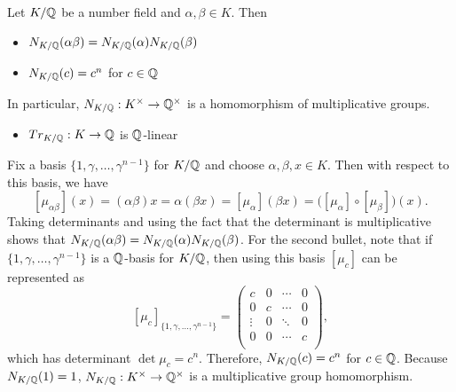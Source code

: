 \begin{prop} 
Let $K/\mathbb{Q}$ be a number field and $\alpha, \beta \in K$. Then 
	\begin{itemize}
	\item $N_{K/\mathbb{Q}}(\alpha\beta)= N_{K/\mathbb{Q}}(\alpha) N_{K/\mathbb{Q}}(\beta)$
	\item $N_{K/\mathbb{Q}}(c)= c^n$ for $c \in \mathbb{Q}$
	\end{itemize}
In particular, $N_{K/\mathbb{Q}}: K^\times \to \mathbb{Q}^\times$ is a homomorphism of multiplicative groups.
	\begin{itemize}
	\item $Tr_{K/\mathbb{Q}}: K \to \mathbb{Q}$ is $\mathbb{Q}$-linear
	\end{itemize}
\end{prop}

\pf Fix a basis $\{ 1, \gamma, \ldots, \gamma^{n-1} \}$ for $K/\mathbb{Q}$ and choose $\alpha, \beta, x \in K$. Then with respect to this basis, we have
	\[
	[\mu_{\alpha\beta}](x)= (\alpha\beta) x= \alpha (\beta x)= [\mu_\alpha](\beta x)= \big( [\mu_\alpha] \circ [\mu_\beta] \big)(x).
	\] 
Taking determinants and using the fact that the determinant is multiplicative shows that $N_{K/\mathbb{Q}}(\alpha\beta)=N_{K/\mathbb{Q}}(\alpha) N_{K/\mathbb{Q}}(\beta)$. For the second bullet, note that if $\{1, \gamma, \ldots, \gamma^{n-1} \}$ is a $\mathbb{Q}$-basis for $K/\mathbb{Q}$, then using this basis $[\mu_c]$ can be represented as 
	\[
	[\mu_c]_{\{1, \gamma, \ldots, \gamma^{n-1} \}}=
	\begin{pmatrix}
	c & 0 & \cdots & 0 \\
	0 & c & \cdots & 0 \\
	\vdots & 0 & \ddots & 0 \\
	0 & 0 & \cdots & c \\
	\end{pmatrix},
	\]
which has determinant $\det \mu_c= c^n$. Therefore, $N_{K/\mathbb{Q}}(c)=c^n$ for $c \in \mathbb{Q}$. Because $N_{K/\mathbb{Q}}(1)= 1$, $N_{K/\mathbb{Q}}: K^\times \to \mathbb{Q}^\times$ is a multiplicative group homomorphism. 

